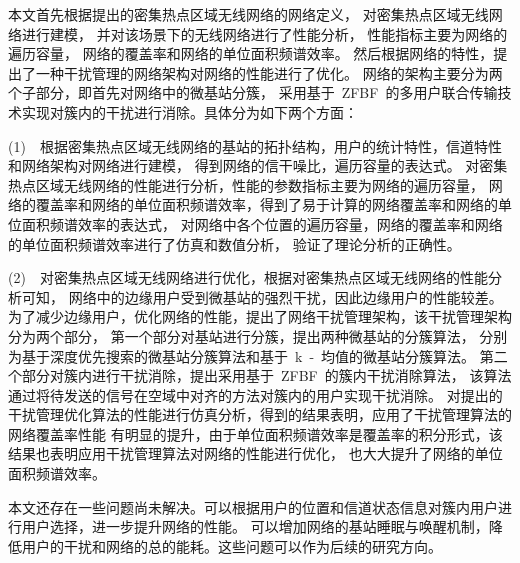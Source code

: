 

本文首先根据提出的密集热点区域无线网络的网络定义，
对密集热点区域无线网络进行建模，
并对该场景下的无线网络进行了性能分析，
性能指标主要为网络的遍历容量，
网络的覆盖率和网络的单位面积频谱效率。
然后根据网络的特性，提出了一种干扰管理的网络架构对网络的性能进行了优化。
网络的架构主要分为两个子部分，即首先对网络中的微基站分簇，
采用基于~ZFBF~的多用户联合传输技术实现对簇内的干扰进行消除。具体分为如下两个方面：

(1)~~根据密集热点区域无线网络的基站的拓扑结构，用户的统计特性，信道特性和网络架构对网络进行建模，
得到网络的信干噪比，遍历容量的表达式。
对密集热点区域无线网络的性能进行分析，性能的参数指标主要为网络的遍历容量，
网络的覆盖率和网络的单位面积频谱效率，得到了易于计算的网络覆盖率和网络的单位面积频谱效率的表达式，
对网络中各个位置的遍历容量，网络的覆盖率和网络的单位面积频谱效率进行了仿真和数值分析，
验证了理论分析的正确性。

(2)~~对密集热点区域无线网络进行优化，根据对密集热点区域无线网络的性能分析可知，
网络中的边缘用户受到微基站的强烈干扰，因此边缘用户的性能较差。
为了减少边缘用户，优化网络的性能，提出了网络干扰管理架构，该干扰管理架构分为两个部分，
第一个部分对基站进行分簇，提出两种微基站的分簇算法，
分别为基于深度优先搜索的微基站分簇算法和基于~k~-~均值的微基站分簇算法。
第二个部分对簇内进行干扰消除，提出采用基于~ZFBF~的簇内干扰消除算法，
该算法通过将待发送的信号在空域中对齐的方法对簇内的用户实现干扰消除。
对提出的干扰管理优化算法的性能进行仿真分析，得到的结果表明，应用了干扰管理算法的网络覆盖率性能
有明显的提升，由于单位面积频谱效率是覆盖率的积分形式，该结果也表明应用干扰管理算法对网络的性能进行优化，
也大大提升了网络的单位面积频谱效率。

本文还存在一些问题尚未解决。可以根据用户的位置和信道状态信息对簇内用户进行用户选择，进一步提升网络的性能。
可以增加网络的基站睡眠与唤醒机制，降低用户的干扰和网络的总的能耗。这些问题可以作为后续的研究方向。
